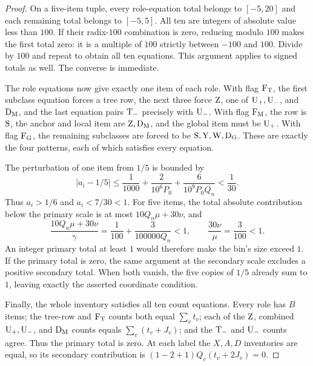 \begin{proof}
On a five-item tuple, every role-equation total belongs to $[-5,20]$
and each remaining total belongs to $[-5,5]$. All ten are integers of
absolute value less than $100$. If their radix-$100$ combination is
zero, reducing modulo $100$ makes the first total zero: it is a
multiple of $100$ strictly between $-100$ and $100$. Divide by $100$
and repeat to obtain all ten equations. This argument applies to signed
totals as well. The converse is immediate.

The role equations now give exactly one item of each role. With flag
$\mathrm{F}_{\mathrm T}$, the first subclass equation forces a tree row, the next three
force $\mathrm{Z}$, one of $\mathrm{U}_{+},\mathrm{U}_{-}$, and $\mathrm{D}_{\mathrm M}$, and the last equation
pairs $\mathrm{T}_{-}$ precisely with $\mathrm{U}_{-}$. With flag $\mathrm{F}_{\mathrm M}$, the row is
$\mathrm{S}$, the anchor and local item are $\mathrm{Z},\mathrm{D}_{\mathrm M}$, and the global
item must be $\mathrm{U}_{+}$. With flag $\mathrm{F}_{\mathrm G}$, the remaining subclasses are
forced to be $\mathrm{S},\mathrm{Y},\mathrm{W},\mathrm{D}_{\mathrm G}$. These are exactly the four
patterns, each of which satisfies every equation.

The perturbation of one item from $1/5$ is bounded by
\[
 |a_i-1/5|
 \le\frac1{1000}+\frac{2}{10^6P_0}
       +\frac{6}{10^9P_0Q_n}<\frac1{30}.
\]
Thus $a_i>1/6$ and $a_i<7/30<1$. For five items, the total absolute
contribution below the primary scale is at most
$10Q_n\mu+30\nu$, and
\[
 \frac{10Q_n\mu+30\nu}{\gamma}
 =\frac1{100}+\frac{3}{100000Q_n}<1,
 \qquad \frac{30\nu}{\mu}=\frac3{100}<1.
\]
An integer primary total at least $1$ would therefore make the bin's
size exceed $1$. If the primary total is zero, the same argument at
the secondary scale excludes a positive secondary total. When both
vanish, the five copies of $1/5$ already sum to $1$, leaving exactly
the asserted coordinate condition.

Finally, the whole inventory satisfies all ten count equations. Every
role has $B$ items; the tree-row and $\mathrm{F}_{\mathrm T}$ counts both equal
$\sum_vt_v$; each of the $\mathrm{Z}$, combined $\mathrm{U}_{+},\mathrm{U}_{-}$, and $\mathrm{D}_{\mathrm M}$
counts equals $\sum_v(t_v+J_v)$; and the $\mathrm{T}_{-}$ and $\mathrm{U}_{-}$ counts
agree. Thus the primary total is zero. At each label the $X,A,D$
inventories are equal, so its secondary contribution is
$(1-2+1)Q_v(t_v+2J_v)=0$.
\end{proof}

